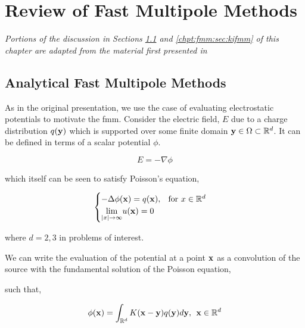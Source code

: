 
\chapter{Review of Fast Multipole Methods}\label{chpt:fmm}
\thispagestyle{chaptertitle} %

\begin{center}
    \textit{Portions of the discussion in Sections \ref{chpt:fmm:sec:analytical} and \ref{chpt:fmm:sec:kifmm} of this chapter are adapted from the material first presented in \cite{kailasa2024m2ltranslationoperatorskernel} }
\end{center}

\section{Analytical Fast Multipole Methods}\label{chpt:fmm:sec:analytical}

As in the original presentation, we use the case of evaluating electrostatic potentials to motivate the \acrshort{fmm}. Consider the electric field, $E$ due to a charge distribution $q(\mathbf{y})$ which is supported over some finite domain $\mathbf{y} \in \Omega \subset \mathbb{R}^d$. It can be defined in terms of a scalar potential $\phi$.

\begin{equation*}
E = -\nabla \phi
\end{equation*}

which itself can be seen to satisfy Poisson's equation,

\begin{equation*}
    \begin{cases}
        - \Delta \phi(\mathbf{x}) = q(\mathbf{x}), \> \> \text{  for } x\in \mathbb{R}^d \\
        \underset{|x| \rightarrow \infty}{\lim } u(\mathbf{x}) = 0
    \end{cases}
\end{equation*}


where $d=2,3$ in problems of interest.

We can write the evaluation of the potential at a point $\mathbf{x}$ as a convolution of the source with the fundamental solution of the Poisson equation,

such that,

\begin{equation}
\phi(\mathbf{x}) = \int_{\mathbb{R}^d} K(\mathbf{x}-\mathbf{y})q(\mathbf{y}) d\mathbf{y}, \> \> \mathbf{x} \in \mathbb{R}^d
\end{equation}\label{eq:chpt:fmm:laplace_potential_integral}

